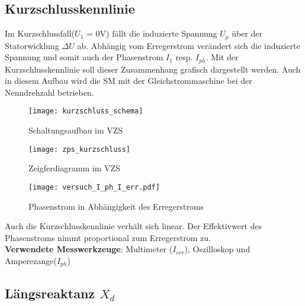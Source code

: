 \begin{flushleft}
\newpage






\subsection{Kurzschlusskennlinie}

Im Kurzschlussfall($U_1$ = 0V) fällt die induzierte Spannung $U_p$ über der Statorwicklung $\Delta U$ ab. Abhängig vom Erregerstrom verändert sich die induzierte Spannung und somit auch der Phasenstrom $I_1$ resp. $I_{ph}$.
Mit der Kurzschlusskennlinie soll dieser Zusammenhang grafisch dargestellt werden.
Auch in diesem Aufbau wird die SM mit der Gleichstrommaschine bei der Nenndrehzahl   betrieben.\\

\vspace{1cm}
 
 
\begin{figure}[H]
    \centering
        \texttt{[image: kurzschluss\_schema]}
    \caption{Schaltungsaufbau im VZS}
    \label{fig:abb1}
\end{figure}



\begin{figure}[H]
    \centering
        \texttt{[image: zps\_kurzschluss]}
    \caption{Zeigferdiagramm im VZS}
    \label{fig:abb1}
\end{figure}


\begin{figure}[H]
    \centering
        \texttt{[image: versuch\_I\_ph\_I\_err.pdf]}
    \caption{Phasenstrom in Abhängigkeit des Erregerstroms}
    \label{fig:abb1}
\end{figure}

Auch die Kurzschlusskennlinie verhält sich linear. Der Effektivwert des Phasenstroms nimmt proportional zum Erregerstrom zu.\\

\vspace{0.4cm}
\textbf{Verwendete Messwerkzeuge}: Multimeter ($I_{err}$), Oszilloskop und Amperezange($I_{ph}$) 




\newpage
\subsection{Längsreaktanz $X_d$}


\end{flushleft}
